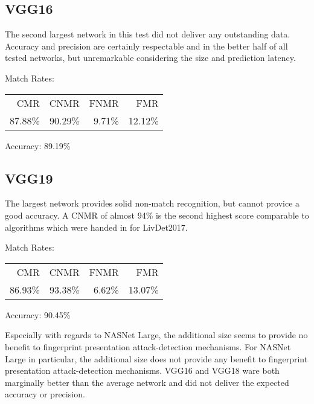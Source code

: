 \bigskip
\subsection{VGG16}
\begin{minipage}[c]{0.7\textwidth}
    The second largest network in this test did not deliver any outstanding data.
    Accuracy and precision are certainly respectable and in the better half of all tested networks, but unremarkable considering the size and prediction latency.

    \medskip\noindent\centering Match Rates: 
    \begin{tabular}{ r  r  r  r |}
        CMR       & CNMR      & FNMR     & FMR     \\
        87.88\%   & 90.29\%   & 9.71\%   & 12.12\%  \\
    \end{tabular} \hspace{2mm} Accuracy: 89.19\%
\end{minipage}
\hfill
\begin{minipage}[c]{0.3\textwidth}
    \centering
    
\end{minipage}



\bigskip
\subsection{VGG19}

\begin{minipage}[c]{0.7\textwidth}
    The largest network provides solid non-match recognition, but cannot provice a good accuracy.
    A CNMR of almost 94\% is the second highest score comparable to algorithms which were handed in for LivDet2017.

    \medskip\noindent\centering Match Rates: 
    \begin{tabular}{ r  r  r  r |}
        CMR       & CNMR      & FNMR     & FMR     \\
        86.93\%   & 93.38\%   & 6.62\%   & 13.07\%  \\
    \end{tabular} \hspace{2mm} Accuracy: 90.45\%
\end{minipage}
\hfill
\begin{minipage}[c]{0.3\textwidth}
    \centering
    
\end{minipage}


\bigskip\noindent
Especially with regards to NASNet Large, the additional size seems to provide no benefit to fingerprint presentation attack-detection mechanisms.
For NASNet Large in particular, the additional size does not provide any benefit to fingerprint presentation attack-detection mechanisms.
VGG16 and VGG18 ware both marginally better than the average network and did not deliver the expected accuracy or precision.

